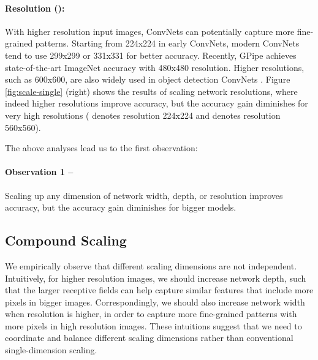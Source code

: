 \documentclass{article}
\begin{document}
\paragraph{Resolution (): } With higher resolution input images, ConvNets can potentially capture more fine-grained patterns. Starting from 224x224 in early ConvNets, modern ConvNets tend to use 299x299 \cite{inceptionv316} or 331x331 \cite{nas_imagenet18} for better accuracy. Recently, GPipe \cite{gpipe18} achieves state-of-the-art ImageNet accuracy with 480x480 resolution. Higher resolutions, such as 600x600, are also widely used in object detection ConvNets \cite{maskrcnn17,retinanet17}. Figure \ref{fig:scale-single} (right) shows the results of scaling network resolutions, where indeed higher resolutions improve accuracy, but the accuracy gain diminishes for very high resolutions ( denotes resolution 224x224 and  denotes resolution 560x560).

The above analyses lead us to the first observation: 

\noindent \paragraph{Observation 1 -- } Scaling up any dimension of  network width, depth, or resolution improves accuracy, but the accuracy gain diminishes for bigger models.

\subsection{Compound Scaling}

We empirically observe that different scaling dimensions are not independent. Intuitively, for higher resolution images, we should increase network depth, such that the larger receptive fields can help capture similar features that include more pixels in bigger images. Correspondingly, we should also increase network width when resolution is higher,  in order to capture more fine-grained patterns with more pixels in high resolution images. These intuitions suggest that we need to coordinate and balance different scaling dimensions rather than conventional single-dimension scaling.
\end{document}
